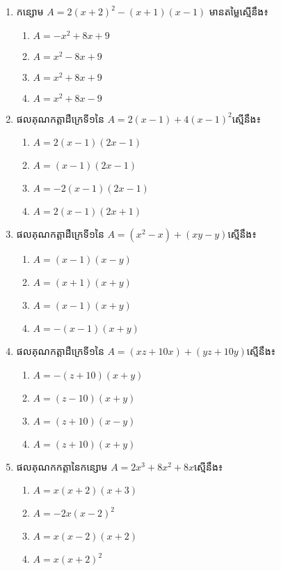 \begin{enumerate}
\item កន្សោម $A=2(x+2)^2-(x+1)(x-1)$ មានតម្លៃស្មើនឹង៖
\begin{multicols}{2}
\begin{enumerate}[label=\alph*.]
\item $A=-x^2+8x+9$
\item $A=x^2-8x+9$
\item $A=x^2+8x+9$
\item $A=x^2+8x-9$
\end{enumerate}
\end{multicols}

\item ផលគុណកត្តាដឺក្រេទី១នៃ $A=2(x-1)+4(x-1)^2$ស្មើនឹង៖
\begin{multicols}{2}
\begin{enumerate}[label=\alph*.]
\item $A=2(x-1)(2x-1)$
\item $A=(x-1)(2x-1)$
\item $A=-2(x-1)(2x-1)$
\item $A=2(x-1)(2x+1)$
\end{enumerate}
\end{multicols}

\item ផលគុណកត្តាដឺក្រេទី១នៃ $A=(x^2-x)+(xy-y)$ស្មើនឹង៖
\begin{multicols}{2}
\begin{enumerate}[label=\alph*.]
\item $A=(x-1)(x-y)$
\item $A=(x+1)(x+y)$
\item $A=(x-1)(x+y)$
\item $A=-(x-1)(x+y)$
\end{enumerate}
\end{multicols}

\item ផលគុណកត្តាដឺក្រេទី១នៃ $A=(xz+10x)+(yz+10y)$ស្មើនឹង៖
\begin{multicols}{2}
\begin{enumerate}[label=\alph*.]
\item $A=-(z+10)(x+y)$
\item $A=(z-10)(x+y)$
\item $A=(z+10)(x-y)$
\item $A=(z+10)(x+y)$
\end{enumerate}
\end{multicols}

\item ផលគុណកកត្តានៃកន្សោម $A=2x^3+8x^2+8x$ស្មើនឹង៖
\begin{multicols}{2}
\begin{enumerate}[label=\alph*.]
\item $A=x(x+2)(x+3)$
\item $A=-2x(x-2)^2$
\item $A=x(x-2)(x+2)$
\item $A=x(x+2)^2$
\end{enumerate}
\end{multicols}


\end{enumerate}

